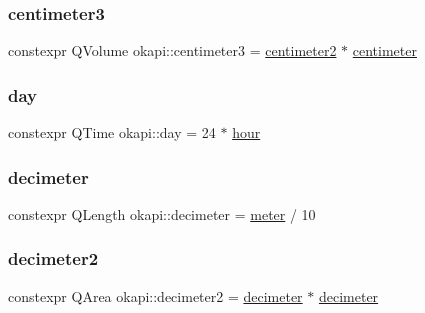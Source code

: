 \mbox{\label{namespaceokapi_a2a86923c7b72c51af38c1e3771fd024c}} 
\subsubsection{\texorpdfstring{centimeter3}{centimeter3}}
{\footnotesize\ttfamily constexpr Q\+Volume okapi\+::centimeter3 = \mbox{\hyperlink{namespaceokapi_a9395c9d47680dc1bef1f41744f1a3a9c}{centimeter2}} $\ast$ \mbox{\hyperlink{namespaceokapi_a889129a4ecb3e93c695c8eea53b96602}{centimeter}}}

\mbox{\label{namespaceokapi_a5bb9617e1f2db13eaad2fe9d47f49195}} 
\subsubsection{\texorpdfstring{day}{day}}
{\footnotesize\ttfamily constexpr Q\+Time okapi\+::day = 24 $\ast$ \mbox{\hyperlink{namespaceokapi_a43d321d318cb594798b60a6be26e85ce}{hour}}}

\mbox{\label{namespaceokapi_adeefe08fd5193fd9090e198b1a3463b9}} 
\subsubsection{\texorpdfstring{decimeter}{decimeter}}
{\footnotesize\ttfamily constexpr Q\+Length okapi\+::decimeter = \mbox{\hyperlink{namespaceokapi_a59563b3d4b18633f1c8d852e2932d1db}{meter}} / 10}

\mbox{\label{namespaceokapi_a554ff440baa9c27432dcbc8068fbf47e}} 
\subsubsection{\texorpdfstring{decimeter2}{decimeter2}}
{\footnotesize\ttfamily constexpr Q\+Area okapi\+::decimeter2 = \mbox{\hyperlink{namespaceokapi_adeefe08fd5193fd9090e198b1a3463b9}{decimeter}} $\ast$ \mbox{\hyperlink{namespaceokapi_adeefe08fd5193fd9090e198b1a3463b9}{decimeter}}}

